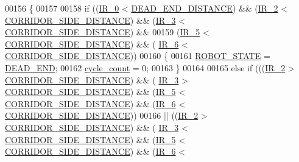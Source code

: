 \begin{DoxyCode}
00156         \{
00157             
00158             \textcolor{keywordflow}{if} ((\hyperlink{state__machine_8c_a7afcf874a71b2cde367dc9c28f5f01f1}{IR\_0} < \hyperlink{state__machine_8c_aa31835133338361e7bffbaf776c9c7a1}{DEAD\_END\_DISTANCE}) && (\hyperlink{state__machine_8c_a07cfb2e201909d017a88a2a86c32cd4b}{IR\_2} < 
      \hyperlink{state__machine_8c_a201d56046ddf552d57b4862e0ec07a10}{CORRIDOR\_SIDE\_DISTANCE}) && (\hyperlink{state__machine_8c_a7831b71dc250258ecefe0e23f9920688}{IR\_3} < 
      \hyperlink{state__machine_8c_a201d56046ddf552d57b4862e0ec07a10}{CORRIDOR\_SIDE\_DISTANCE}) && 
00159                 (\hyperlink{state__machine_8c_ad00ba6cc1cf461bda7059f5aafc06142}{IR\_5} < \hyperlink{state__machine_8c_a201d56046ddf552d57b4862e0ec07a10}{CORRIDOR\_SIDE\_DISTANCE}) && (
      \hyperlink{state__machine_8c_a8c51bcd8b555e8c78fea79b88d28b55e}{IR\_6} < \hyperlink{state__machine_8c_a201d56046ddf552d57b4862e0ec07a10}{CORRIDOR\_SIDE\_DISTANCE}))
00160             \{
00161                 \hyperlink{state__machine_8h_a5e5321a4a9085b83c8161454bf7a145c}{ROBOT\_STATE} = \hyperlink{state__machine_8h_a94b1da2e055fff4d143aa6aa891f79a9ae66a6dc1f3ff114acf2efb4926e7975e}{DEAD\_END};
00162                 \hyperlink{state__machine_8c_a937f74a65988b9e22241ab3765b82c50}{cycle\_count} = 0;
00163             \}
00164             
00165             \textcolor{keywordflow}{else} \textcolor{keywordflow}{if} (((\hyperlink{state__machine_8c_a07cfb2e201909d017a88a2a86c32cd4b}{IR\_2} > \hyperlink{state__machine_8c_a201d56046ddf552d57b4862e0ec07a10}{CORRIDOR\_SIDE\_DISTANCE}) && (
      \hyperlink{state__machine_8c_a7831b71dc250258ecefe0e23f9920688}{IR\_3} > \hyperlink{state__machine_8c_a201d56046ddf552d57b4862e0ec07a10}{CORRIDOR\_SIDE\_DISTANCE}) && (\hyperlink{state__machine_8c_ad00ba6cc1cf461bda7059f5aafc06142}{IR\_5} < 
      \hyperlink{state__machine_8c_a201d56046ddf552d57b4862e0ec07a10}{CORRIDOR\_SIDE\_DISTANCE}) && (\hyperlink{state__machine_8c_a8c51bcd8b555e8c78fea79b88d28b55e}{IR\_6} < 
      \hyperlink{state__machine_8c_a201d56046ddf552d57b4862e0ec07a10}{CORRIDOR\_SIDE\_DISTANCE}))
00166                   || ((\hyperlink{state__machine_8c_a07cfb2e201909d017a88a2a86c32cd4b}{IR\_2} > \hyperlink{state__machine_8c_a201d56046ddf552d57b4862e0ec07a10}{CORRIDOR\_SIDE\_DISTANCE}) && (
      \hyperlink{state__machine_8c_a7831b71dc250258ecefe0e23f9920688}{IR\_3} < \hyperlink{state__machine_8c_a201d56046ddf552d57b4862e0ec07a10}{CORRIDOR\_SIDE\_DISTANCE}) && (\hyperlink{state__machine_8c_ad00ba6cc1cf461bda7059f5aafc06142}{IR\_5} < 
      \hyperlink{state__machine_8c_a201d56046ddf552d57b4862e0ec07a10}{CORRIDOR\_SIDE\_DISTANCE}) && (\hyperlink{state__machine_8c_a8c51bcd8b555e8c78fea79b88d28b55e}{IR\_6} < 

\end{DoxyCode}
